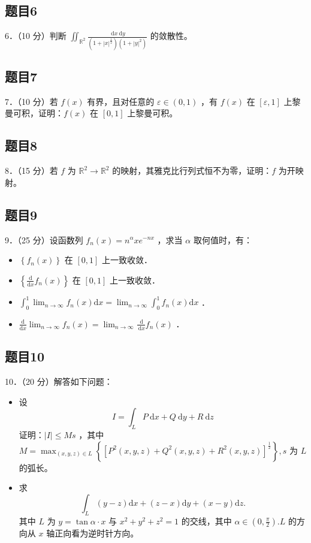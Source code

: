 \documentclass{article}
\begin{document}
\subsection{题目6}
6．（10 分）判断 \(\iint_{\mathbb{R}^{2}} \frac{\mathrm{~d} x \mathrm{~d} y}{\left(1+|x|^{\frac{1}{2}}\right)\left(1+|y|^{2}\right)}\) 的敛散性。

\subsection{题目7}
7．（10 分）若 \(f(x)\) 有界，且对任意的 \(\varepsilon \in(0,1)\) ，有 \(f(x)\) 在 \([\varepsilon, 1]\) 上黎曼可积，证明：\(f(x)\) 在 \([0,1]\) 上黎曼可积。

\subsection{题目8}
8．（15 分）若 \(f\) 为 \(\mathbb{R}^{2} \rightarrow \mathbb{R}^{2}\) 的映射，其雅克比行列式恒不为零，证明：\(f\) 为开映射。

\subsection{题目9}
9．（25 分）设函数列 \(f_{n}(x)=n^{\alpha} x e^{-n x}\) ，求当 \(\alpha\) 取何值时，有：

\begin{itemize}
  \item[（1）] \(\left\{f_{n}(x)\right\}\) 在 \([0,1]\) 上一致收敛．
  \item[（2）] \(\left\{\frac{\mathrm{d}}{\mathrm{d} x} f_{n}(x)\right\}\) 在 \([0,1]\) 上一致收敛．
  \item[（3）] \(\int_{0}^{1} \lim _{n \rightarrow \infty} f_{n}(x) \mathrm{d} x=\lim _{n \rightarrow \infty} \int_{0}^{1} f_{n}(x) \mathrm{d} x\) ．
  \item[（4）] \(\frac{\mathrm{d}}{\mathrm{d} x} \lim _{n \rightarrow \infty} f_{n}(x)=\lim _{n \rightarrow \infty} \frac{\mathrm{~d}}{\mathrm{~d} x} f_{n}(x)\) ．
\end{itemize}

\subsection{题目10}
10．（20 分）解答如下问题：

\begin{itemize}
  \item[（1）] 设
\[
I=\int_{L} P \mathrm{~d} x+Q \mathrm{~d} y+R \mathrm{~d} z
\]
证明：\(|I| \leq M s\) ，其中 \(M=\max _{(x, y, z) \in L}\left\{\left[P^{2}(x, y, z)+Q^{2}(x, y, z)+R^{2}(x, y, z)\right]^{\frac{1}{2}}\right\}, s\) 为 \(L\) 的弧长。
  \item[（2）] 求
\[
\int_{L}(y-z) \mathrm{d} x+(z-x) \mathrm{d} y+(x-y) \mathrm{d} z .
\]
其中 \(L\) 为 \(y=\tan \alpha \cdot x\) 与 \(x^{2}+y^{2}+z^{2}=1\) 的交线，其中 \(\alpha \in\left(0, \frac{\pi}{2}\right) . L\) 的方向从 \(x\) 轴正向看为逆时针方向。
\end{itemize}
\end{document}
